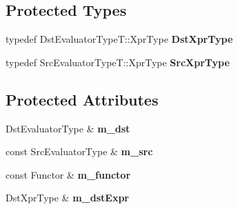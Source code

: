 \subsection*{Protected Types}
\begin{DoxyCompactItemize}
\item 
\mbox{\label{class_eigen_1_1internal_1_1generic__dense__assignment__kernel_af8e9503cf14af5b67c678cc7908554a9}} 
typedef Dst\+Evaluator\+Type\+T\+::\+Xpr\+Type {\bfseries Dst\+Xpr\+Type}
\item 
\mbox{\label{class_eigen_1_1internal_1_1generic__dense__assignment__kernel_ad41c9cdbb78e6c5e7371dd694a907d0d}} 
typedef Src\+Evaluator\+Type\+T\+::\+Xpr\+Type {\bfseries Src\+Xpr\+Type}
\end{DoxyCompactItemize}
\subsection*{Protected Attributes}
\begin{DoxyCompactItemize}
\item 
\mbox{\label{class_eigen_1_1internal_1_1generic__dense__assignment__kernel_a8df443ccdd70a127d6c6bc4578ca1660}} 
Dst\+Evaluator\+Type \& {\bfseries m\+\_\+dst}
\item 
\mbox{\label{class_eigen_1_1internal_1_1generic__dense__assignment__kernel_a415b02ffc7e2621aac6b375240f42ae8}} 
const Src\+Evaluator\+Type \& {\bfseries m\+\_\+src}
\item 
\mbox{\label{class_eigen_1_1internal_1_1generic__dense__assignment__kernel_a9823fd7d0d9532d51d9c16b4c4fd677f}} 
const Functor \& {\bfseries m\+\_\+functor}
\item 
\mbox{\label{class_eigen_1_1internal_1_1generic__dense__assignment__kernel_a069eb508282a98930fc5be0b6099c4d0}} 
Dst\+Xpr\+Type \& {\bfseries m\+\_\+dst\+Expr}
\end{DoxyCompactItemize}


